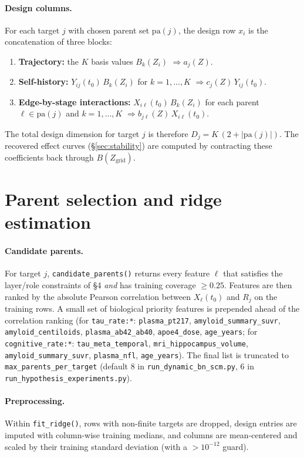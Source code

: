 \documentclass[11pt]{article}
\newcommand{\code}[1]{\texttt{#1}}
\begin{document}
\paragraph{Design columns.} For each target $j$ with chosen parent set
$\mathrm{pa}(j)$, the design row $x_i$ is the concatenation of three blocks:
\begin{enumerate}[leftmargin=*,nosep]
  \item \textbf{Trajectory:} the $K$ basis values $B_k(Z_i)$ $\Rightarrow a_j(Z)$.
  \item \textbf{Self-history:} $Y_{ij}(t_0)\, B_k(Z_i)$ for $k=1,\dots,K$ $\Rightarrow c_j(Z)\,Y_{ij}(t_0)$.
  \item \textbf{Edge-by-stage interactions:} $X_{i\ell}(t_0)\, B_k(Z_i)$ for each parent $\ell \in \mathrm{pa}(j)$ and $k=1,\dots,K$ $\Rightarrow b_{j\ell}(Z)\,X_{i\ell}(t_0)$.
\end{enumerate}
The total design dimension for target $j$ is therefore
$D_j = K\,(2 + |\mathrm{pa}(j)|)$. The recovered effect curves
(\S\ref{sec:stability}) are computed by contracting these coefficients back
through $B(Z_{\text{grid}})$.

\section{Parent selection and ridge estimation}

\paragraph{Candidate parents.} For target $j$, \code{candidate\_parents()}
returns every feature $\ell$ that satisfies the layer/role constraints of
\S4 \emph{and} has training coverage $\geq 0.25$. Features are then ranked
by the absolute Pearson correlation between $X_\ell(t_0)$ and $R_j$ on the
training rows. A small set of biological priority features is prepended
ahead of the correlation ranking (for \code{tau\_rate:*}:
\code{plasma\_pt217}, \code{amyloid\_summary\_suvr},
\code{amyloid\_centiloids}, \code{plasma\_ab42\_ab40}, \code{apoe4\_dose},
\code{age\_years}; for \code{cognitive\_rate:*}: \code{tau\_meta\_temporal},
\code{mri\_hippocampus\_volume}, \code{amyloid\_summary\_suvr},
\code{plasma\_nfl}, \code{age\_years}). The final list is truncated to
\code{max\_parents\_per\_target} (default $8$ in
\code{run\_dynamic\_bn\_scm.py}, $6$ in
\code{run\_hypothesis\_experiments.py}).

\paragraph{Preprocessing.} Within \code{fit\_ridge()}, rows with non-finite
targets are dropped, design entries are imputed with column-wise training
medians, and columns are mean-centered and scaled by their training
standard deviation (with a $> 10^{-12}$ guard).
\end{document}
